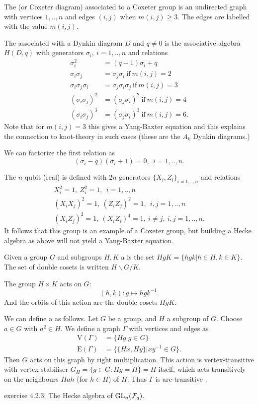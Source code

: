 \documentclass[12pt]{article}
\begin{document}
The  (or Coxeter diagram)
associated to a Coxeter group is an undirected graph
with vertices $1,..,n$ and edges $(i,j)$ when $m(i,j)\ge 3.$
The edges are labelled with the value $m(i,j)$.

The  associated with a Dynkin diagram $D$
and $q\ne 0$ 
is the associative algebra $H(D,q)$ with
generators $\sigma_i,\ i=1,..,n$ and relations
\begin{align*}
\sigma_i^2 &= (q-1)\sigma_i + q \\
\sigma_i \sigma_j &= \sigma_j \sigma_i \ \mbox{if}\ m(i,j)=2 \\
\sigma_i \sigma_j \sigma_i &= \sigma_j \sigma_i \sigma_j \ \mbox{if}\ m(i,j)=3 \\
(\sigma_i \sigma_j)^2 &= (\sigma_j \sigma_i)^2 \ \mbox{if}\ m(i,j)=4 \\
(\sigma_i \sigma_j)^3 &= (\sigma_j \sigma_i)^3 \ \mbox{if}\ m(i,j)=6.
\end{align*}
Note that for $m(i,j)=3$ this gives a Yang-Baxter equation and this
explains the connection to knot-theory in such cases (these are the $A_k$ Dynkin diagrams.)

We can factorize the first relation as
$$
    (\sigma_i - q)(\sigma_i + 1) = 0, \ \ i=1,..,n.
$$

The $n$-qubit (real)  is defined with
$2n$ generators $\{X_i, Z_i\}_{i=1,..,n}$
and relations
\begin{align*}
    X_i^2 = 1,       \ Z_i^2 = 1,\ \ i=1,..,n\\
    (X_i X_j)^2 = 1, \ (Z_i Z_j)^2 = 1,\ \ i,j=1,..,n\\
    (X_i Z_j)^2 = 1, \ (X_i Z_i)^4 = 1, \ i\ne j,\ i,j=1,..,n.
\end{align*}
It follows that this group is an example of a Coxeter group,
but building a Hecke algebra as above will not yield a 
Yang-Baxter equation.


Given a group $G$ and subgroups $H, K$ a
is the set $HgK=\{hgk | h\in H, k\in K\}.$
The set of double cosets is written $H\backslash G/K.$

%

The group $H\times K$ acts on $G:$ 
$$
    (h, k) : g \mapsto hgk^{-1}.
$$
And the orbits of this action are the double cosets $HgK.$

We can define a  as follows.
Let $G$ be a group, and $H$ a subgroup of $G.$
Choose $a\in G$ with $a^2\in H.$
We define a graph $\Gamma$
with vertices and edges as
\begin{align*}
    \mbox{V}(\Gamma) &= \{ Hg | g\in G\} \\
    \mbox{E}(\Gamma) &= \{ \{Hx, Hy\} | xy^{-1}\in G\}.
\end{align*}
Then $G$ acts on this graph by right multiplication.
This action is vertex-transitive with vertex stabiliser
$G_H = \{g \in G : Hg = H\} = H$ itself, which acts
transitively on the neighbours $Hah$ (for $h \in H$) of $H$.
Thus $\Gamma$ is arc-transitive \cite{Sabidussi1964}.


\cite{Kassel2010}
exercise 4.2.3: The Hecke algebra of $\mathrm{GL}_n(\mathcal{F}_q).$


{}

\end{document}
